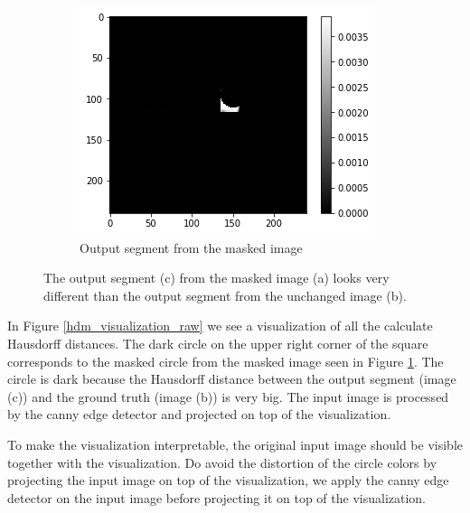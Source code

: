 \begin{figure}[H]
    \begin{subfigure}[t]{.32\textwidth}
        \centering
        \includegraphics[width=\linewidth]{chapters/06_hdm/visualization/segment.png}
        \caption{Output segment from the masked image}
    \end{subfigure}
    \caption{The output segment (c) from the masked image (a) looks very different than the output segment from the unchanged image (b).}
    \label{hdm_visualization_sample}
\end{figure}

In Figure \ref{hdm_visualization_raw} we see a visualization of all the calculate Hausdorff distances. The dark circle on the upper right corner of the square corresponds to the masked circle from the masked image seen in Figure \ref{hdm_visualization_sample}. The circle is dark because the Hausdorff distance between the output segment (image (c)) and the ground truth (image (b)) is very big. The input image is processed by the canny edge detector and projected on top of the visualization.

To make the visualization interpretable, the original input image should be visible together with the visualization. Do avoid the distortion of the circle colors by projecting
the input image on top of the visualization, we apply the canny edge detector \cite{canny1987computational} on the input image before projecting it on top of the visualization.

